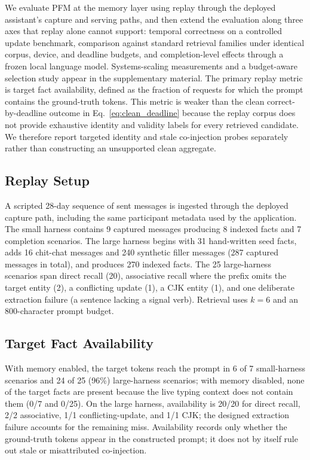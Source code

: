 \documentclass[letterpaper]{article} %
\begin{document}
We evaluate PFM at the memory layer using replay through the deployed assistant's capture and serving paths, and then extend the evaluation along three axes that replay alone cannot support: temporal correctness on a controlled update benchmark, comparison against standard retrieval families under identical corpus, device, and deadline budgets, and completion-level effects through a frozen local language model. Systems-scaling measurements and a budget-aware selection study appear in the supplementary material. The primary replay metric is target fact availability, defined as the fraction of requests for which the prompt contains the ground-truth tokens. This metric is weaker than the clean correct-by-deadline outcome in Eq.~\eqref{eq:clean_deadline} because the replay corpus does not provide exhaustive identity and validity labels for every retrieved candidate. We therefore report targeted identity and stale co-injection probes separately rather than constructing an unsupported clean aggregate.

\subsection{Replay Setup}

A scripted 28-day sequence of sent messages is ingested through the deployed capture path, including the same participant metadata used by the application. The small harness contains 9 captured messages producing 8 indexed facts and 7 completion scenarios. The large harness begins with 31 hand-written seed facts, adds 16 chit-chat messages and 240 synthetic filler messages (287 captured messages in total), and produces 270 indexed facts. The 25 large-harness scenarios span direct recall (20), associative recall where the prefix omits the target entity (2), a conflicting update (1), a CJK entity (1), and one deliberate extraction failure (a sentence lacking a signal verb). Retrieval uses $k=6$ and an 800-character prompt budget.

\subsection{Target Fact Availability}

With memory enabled, the target tokens reach the prompt in 6 of 7 small-harness scenarios and 24 of 25 (96\%) large-harness scenarios; with memory disabled, none of the target facts are present because the live typing context does not contain them (0/7 and 0/25). On the large harness, availability is 20/20 for direct recall, 2/2 associative, 1/1 conflicting-update, and 1/1 CJK; the designed extraction failure accounts for the remaining miss. Availability records only whether the ground-truth tokens appear in the constructed prompt; it does not by itself rule out stale or misattributed co-injection.
\end{document}
